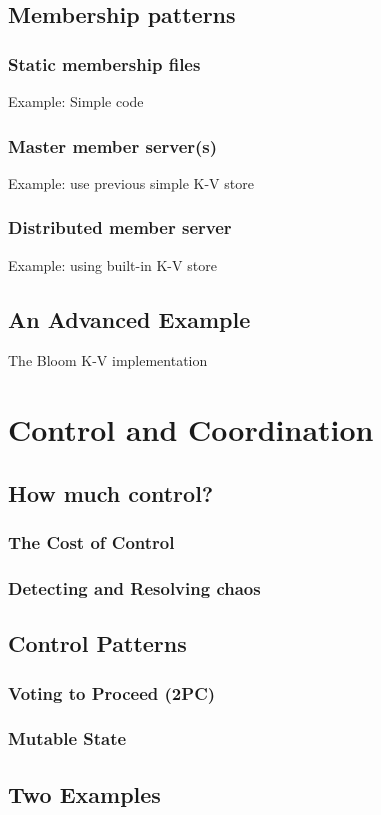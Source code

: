 \documentclass[]{book}
\begin{document}
    \section{Membership patterns}
        \subsection{Static membership files}
         Example: Simple code
        \subsection{Master member server(s)}
         Example: use previous simple K-V store
        \subsection{Distributed member server}
        Example: using built-in K-V store
    \section{An Advanced Example}
        The Bloom K-V implementation

\chapter{Control and Coordination}
    \section{How much control?}
        \subsection{The Cost of Control}
        \subsection{Detecting and Resolving chaos}
    \section{Control Patterns}
        \subsection{Voting to Proceed (2PC)}
        \subsection{Mutable State}
    \section{Two Examples}
\end{document}
